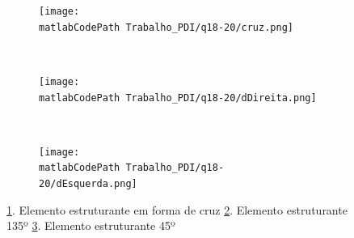 \documentclass[
	article,			%
	11pt,				%
	oneside,			%
	a4paper,			%
	english,			%
	brazil,				%
	sumario=tradicional
	]{abntex2}
\newcommand{\matlabCodePath}{/home/clifte/git/Mestrado/Matlab/}
\begin{document}
\begin{figure}
		\centering 
        \begin{subfigure}[b]{0.3\textwidth}
                \texttt{[image: \\matlabCodePath
                Trabalho\_PDI/q18-20/cruz.png]}
                \caption{}
                \label{subfig:esCruz}
        \end{subfigure}%
        ~ %
 		\begin{subfigure}[b]{0.3\textwidth}
                \texttt{[image: \\matlabCodePath
		Trabalho\_PDI/q18-20/dDireita.png]}
                \caption{}
                \label{subfig:dDireita}
        \end{subfigure}
        ~%
		\begin{subfigure}[b]{0.3\textwidth}
                \texttt{[image: \\matlabCodePath
		Trabalho\_PDI/q18-20/dEsquerda.png]}
                \caption{}
                \label{subfig:dEsquerda}
        \end{subfigure}%
        
        \caption{ 
        \ref{subfig:esCruz}. Elemento estruturante em forma de cruz
        \ref{subfig:dDireita}. Elemento estruturante 135º
        \ref{subfig:dEsquerda}. Elemento estruturante 45º
        }
	\label{fig:elemEst}
\end{figure}
\end{document}
